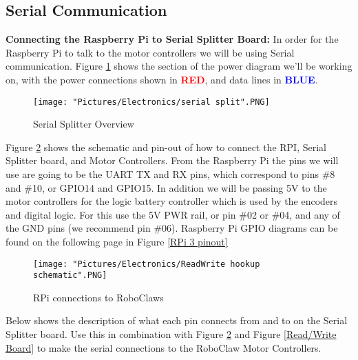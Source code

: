 \documentclass[12pt]{article}
\begin{document}
\subsection{Serial Communication}

\textbf{Connecting the Raspberry Pi to Serial Splitter Board:} In order for the Raspberry Pi to talk to the motor controllers we will be using Serial communication. Figure \ref{ss} shows the section of the power diagram we'll be working on, with the power connections shown in \textcolor{red}{\textbf{RED}}, and data lines in \textcolor{blue}{\textbf{BLUE}}. 

\begin{figure}[H]
  	\centering
    	\texttt{[image: "Pictures/Electronics/serial split".PNG]}
 	\caption{Serial Splitter Overview}
	\label{ss}
\end{figure}




Figure \ref{rpi to rc} shows the schematic and pin-out of how to connect the RPI, Serial Splitter board, and Motor Controllers. From the Raspberry Pi the pins we will use are going to be the UART TX and RX pins, which correspond to pins \#8 and \#10, or GPIO14 and GPIO15. In addition we will be passing 5V to the motor controllers for the logic battery controller which is used by the encoders and digital logic. For this use the 5V PWR rail, or pin  \#02 or \#04, and any of the GND pins (we recommend pin \#06). Raspberry Pi GPIO diagrams can be found on the following page in Figure \ref{RPi 3 pinout}

\begin{figure}[H]
 	\centering
	\texttt{[image: "Pictures/Electronics/ReadWrite hookup schematic".PNG]}
 	\caption{RPi connections to RoboClaws}
	\label{rpi to rc}
\end{figure}


Below shows the description of what each pin connects from and to on the Serial Splitter board. Use this in combination with Figure \ref{rpi to rc} and Figure \ref{Read/Write Board} to make the serial connections to the RoboClaw Motor Controllers. 
\end{document}
